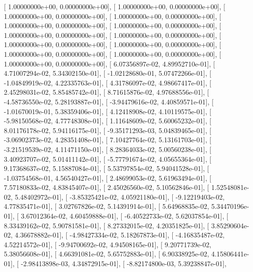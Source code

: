 \documentclass{article}
\begin{document}
       [  1.00000000e+00,   0.00000000e+00],
       [  1.00000000e+00,   0.00000000e+00],
       [  1.00000000e+00,   0.00000000e+00],
       [  1.00000000e+00,   0.00000000e+00],
       [  1.00000000e+00,   0.00000000e+00],
       [  1.00000000e+00,   0.00000000e+00],
       [  1.00000000e+00,   0.00000000e+00],
       [  1.00000000e+00,   0.00000000e+00],
       [  1.00000000e+00,   0.00000000e+00],
       [  1.00000000e+00,   0.00000000e+00],
       [  1.00000000e+00,   0.00000000e+00],
       [  1.00000000e+00,   0.00000000e+00],
       [  1.00000000e+00,   0.00000000e+00],
       [  6.07356897e-02,   4.89952710e-01],
       [  4.71007294e-02,   5.34302150e-01],
       [ -1.02128680e-01,   5.07472266e-01],
       [ -1.04849919e-02,   4.22335763e-01],
       [  4.31786097e-02,   4.98667417e-01],
       [  2.45298031e-02,   5.85485742e-01],
       [  8.71615876e-02,   4.97688556e-01],
       [ -4.58736550e-02,   5.28193887e-01],
       [ -3.94479616e-02,   4.40859571e-01],
       [ -1.01670019e-01,   5.38359406e-01],
       [  4.12418908e-02,   4.10119575e-01],
       [ -5.98150568e-02,   4.77748308e-01],
       [  1.11648609e-02,   5.60065232e-01],
       [  8.01176178e-02,   5.94116175e-01],
       [ -9.35171293e-03,   5.04839465e-01],
       [ -3.06902373e-02,   4.28351408e-01],
       [  7.10427764e-02,   5.13161703e-01],
       [ -3.21519539e-02,   4.11471150e-01],
       [  8.28364033e-02,   5.00560238e-01],
       [  3.40923707e-02,   5.01411142e-01],
       [ -5.77791674e-02,   4.05655364e-01],
       [  9.17368637e-02,   5.15887084e-01],
       [  5.53797854e-02,   5.94041528e-01],
       [ -1.03754568e-01,   4.56540427e-01],
       [  2.48699053e-02,   5.61963494e-01],
       [  7.57180833e-02,   4.83845407e-01],
       [  2.45026560e-02,   5.10562846e-01],
       [  1.52548081e-02,   5.48402972e-01],
       [ -3.85325421e-02,   4.05921180e-01],
       [ -9.12219403e-02,   4.77835471e-01],
       [  3.02767826e-02,   5.14391914e-01],
       [  5.64968835e-02,   5.34470196e-01],
       [  3.67012364e-02,   4.60459888e-01],
       [ -6.40522733e-02,   5.62037854e-01],
       [  8.33439162e-02,   5.90781581e-01],
       [  8.27332015e-02,   4.20351825e-01],
       [  3.85290604e-02,   4.36678882e-01],
       [ -4.98427334e-02,   5.18267873e-01],
       [ -4.16835487e-02,   4.52214572e-01],
       [ -9.94700692e-02,   4.94508165e-01],
       [  9.20771739e-02,   5.38056608e-01],
       [  4.66391081e-02,   5.65752883e-01],
       [  6.90338925e-02,   4.15806441e-01],
       [ -2.98413898e-03,   4.34872915e-01],
       [ -8.82174800e-03,   5.39238847e-01],
\end{document}
